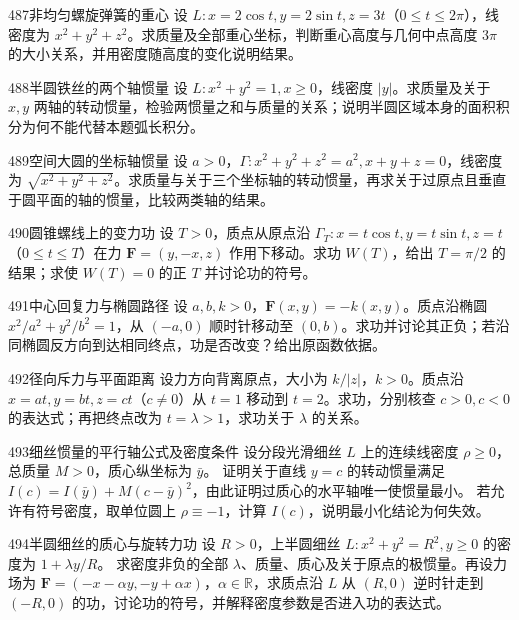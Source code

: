 \begin{exercise}{487}{非均匀螺旋弹簧的重心}
设 $L:x=2\cos t,y=2\sin t,z=3t$（$0\leq t\leq2\pi$），线密度为 $x^2+y^2+z^2$。求质量及全部重心坐标，判断重心高度与几何中点高度 $3\pi$ 的大小关系，并用密度随高度的变化说明结果。
\end{exercise}

\begin{exercise}{488}{半圆铁丝的两个轴惯量}
设 $L:x^2+y^2=1,x\geq0$，线密度 $|y|$。求质量及关于 $x,y$ 两轴的转动惯量，检验两惯量之和与质量的关系；说明半圆区域本身的面积积分为何不能代替本题弧长积分。
\end{exercise}

\begin{exercise}{489}{空间大圆的坐标轴惯量}
设 $a>0$，$\Gamma:x^2+y^2+z^2=a^2,x+y+z=0$，线密度为 $\sqrt{x^2+y^2+z^2}$。求质量与关于三个坐标轴的转动惯量，再求关于过原点且垂直于圆平面的轴的惯量，比较两类轴的结果。
\end{exercise}

\begin{exercise}{490}{圆锥螺线上的变力功}
设 $T>0$，质点从原点沿 $\Gamma_T:x=t\cos t,y=t\sin t,z=t$（$0\leq t\leq T$）在力 $\bm F=(y,-x,z)$ 作用下移动。求功 $W(T)$，给出 $T=\pi/2$ 的结果；求使 $W(T)=0$ 的正 $T$ 并讨论功的符号。
\end{exercise}

\begin{exercise}{491}{中心回复力与椭圆路径}
设 $a,b,k>0$，$\bm F(x,y)=-k(x,y)$。质点沿椭圆 $x^2/a^2+y^2/b^2=1$，从 $(-a,0)$ 顺时针移动至 $(0,b)$。求功并讨论其正负；若沿同椭圆反方向到达相同终点，功是否改变？给出原函数依据。
\end{exercise}

\begin{exercise}{492}{径向斥力与平面距离}
设力方向背离原点，大小为 $k/|z|$，$k>0$。质点沿 $x=at,y=bt,z=ct$（$c\ne0$）从 $t=1$ 移动到 $t=2$。求功，分别核查 $c>0,c<0$ 的表达式；再把终点改为 $t=\lambda>1$，求功关于 $\lambda$ 的关系。
\end{exercise}

\begin{exercise}{493}{细丝惯量的平行轴公式及密度条件}
设分段光滑细丝 $L$ 上的连续线密度 $\rho\geq0$，总质量 $M>0$，质心纵坐标为 $\bar y$。
证明关于直线 $y=c$ 的转动惯量满足
$I(c)=I(\bar y)+M(c-\bar y)^2$，由此证明过质心的水平轴唯一使惯量最小。
若允许有符号密度，取单位圆上 $\rho\equiv-1$，计算 $I(c)$，说明最小化结论为何失效。
\end{exercise}

\begin{exercise}{494}{半圆细丝的质心与旋转力功}
设 $R>0$，上半圆细丝 $L:x^2+y^2=R^2,y\geq0$ 的密度为 $1+\lambda y/R$。
求密度非负的全部 $\lambda$、质量、质心及关于原点的极惯量。再设力场为
$\bm F=(-x-\alpha y,-y+\alpha x)$，$\alpha\in\mathbb R$，求质点沿 $L$ 从 $(R,0)$ 逆时针走到 $(-R,0)$ 的功，讨论功的符号，并解释密度参数是否进入功的表达式。
\end{exercise}

